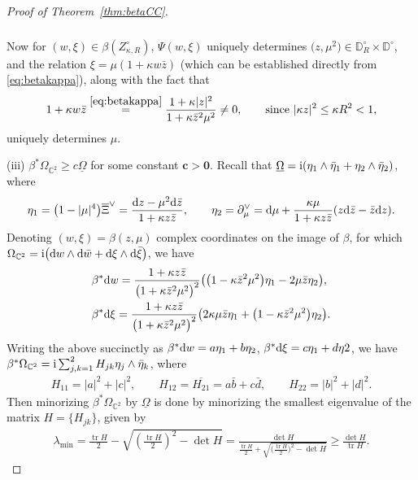 \documentclass[10pt,a4paper]{amsart}
\numberwithin{equation}{section}
\theoremstyle{definition}
\newcommand{\1}{{\bf 1}}
\newcommand \Cm { \mathbb{C}}
\newcommand \Dm { \mathbb{D}}
\newcommand \zbar { \bar{z}}
\begin{document}
\begin{proof}[Proof of Theorem~\ref{thm:betaCC}]
\begin{align*}
\begin{split}
		\end{split}
	\end{align*}
	Now for $(w,\xi)\in \beta(Z_{\kappa,R}^\circ)$, $\Psi(w,\xi)$ uniquely determines $\bigl(z,\mu^2\bigr)\in \Dm_R^\circ\times \Dm^\circ$, and the relation $\xi = \mu (1+\kappa w\zbar)$ (which can be established directly from \eqref{eq:betakappa}), along with the fact that
	\begin{align*}
		1 + \kappa w \zbar \stackrel{\eqref{eq:betakappa}}{=} \frac{1+\kappa |z|^2}{1+\kappa \zbar^2 \mu^2} \ne 0, \qquad \text{since} \  |\kappa z|^2\le\kappa R^2<1,
	\end{align*}
	 uniquely determines $\mu$.


(iii) $\beta^* \Omega_{\Cm^2} \ge c \underline{\Omega}$ for some constant $\boldsymbol{c>0}$. Recall that $\underline{\Omega} ={\rm i} (\eta_1\wedge \bar{\eta}_1 + \eta_2 \wedge \bar{\eta}_2)$, where
	\begin{align*}
		\eta_1 = \bigl(1-|\mu|^4\bigr) \overline{\Xi}^\vee = \frac{{\rm d}z-\mu^2 {\rm d}\zbar}{1+\kappa z\zbar}, \qquad \eta_2 = \partial_\mu^\vee = {\rm d}\mu + \frac{\kappa\mu}{1+\kappa z\zbar} (z{\rm d}\zbar-\zbar {\rm d}z).
	\end{align*}
	Denoting $(w,\xi) = \beta(z,\mu)$ complex coordinates on the image of $\beta$, for which $\Omega_{\Cm^2} = {\rm i} \bigl({\rm d}w\wedge {\rm d}\bar{w} + {\rm d}\xi \wedge {\rm d}\bar{\xi}\bigr)$, we have
	\begin{align*}
		&\beta^* {\rm d}w
= \frac{1+\kappa z\zbar}{\bigl(1+\kappa\zbar^2 \mu^2\bigr)^2} \bigl( \bigl(1-\kappa \zbar^2\mu^2\bigr) \eta_1 - 2\mu\zbar \eta_2 \bigr), \\
		&\beta^* {\rm d}\xi
= \frac{1+\kappa z\zbar}{\bigl(1+\kappa\zbar^2 \mu^2\bigr)^2} \bigl( 2\kappa\mu\zbar \eta_1 + \bigl(1-\kappa\zbar^2\mu^2\bigr) \eta_2 \bigr).
	\end{align*}
	Writing the above succinctly as
$\beta^* {\rm d}w = a\eta_1 + b\eta_2$, $ \beta^* {\rm d}\xi = c\eta_1 + d\eta2$,
	we have $\beta^* \Omega_{\Cm^2} = {\rm i}\sum_{j,k=1}^2 H_{jk} \eta_j \wedge \bar{\eta}_k$, where
	\begin{align*}
		H_{11} = |a|^2 + |c|^2, \qquad H_{12} = \overline{H_{21}} = a \bar{b} + c \bar{d}, \qquad H_{22} = |b|^2 + |d|^2.
	\end{align*}
	Then minorizing $\beta^* \Omega_{\Cm^2}$ by $\underline{\Omega}$ is done by minorizing the smallest eigenvalue of the matrix $H = \{H_{jk}\}$, given by
	\begin{align*}
		\lambda_{\min} = \frac{\operatorname{tr} H}{2} - \sqrt{ \left(\frac{\operatorname{tr} H}{2}\right)^2 - \det H} = \frac{\det H}{\frac{\operatorname{tr} H}{2} + \sqrt{ \bigl(\frac{\operatorname{tr} H}{2}\bigr)^2 - \det H}} \ge \frac{\det H}{\operatorname{tr} H}.

\end{align*}
\end{proof}
\end{document}
